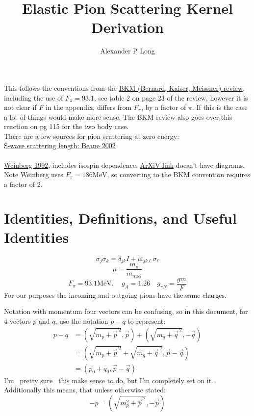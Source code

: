 \documentclass[11pt]{article}
\author{Alexander P Long}
\title{Elastic Pion Scattering Kernel Derivation}
\newcommand{\sq}{^{\,2}}
\begin{document}
\maketitle
This follows the conventions from the \href{https://arxiv.org/abs/hep-ph/9501384v1}{BKM (Bernard, Kaiser, Meissner)  review}, including the use of $F_\pi=93.1$, see table 2 on page 23 of the review, however it is not clear if $F$ in the appendix, differs from $F_\pi$, by a factor of $\pi$. If this is the case a lot of things would make more sense.
The BKM review also goes over this reaction on pg 115 for the two body case.\\

There are a few sources for pion scattering at zero energy:\\
\href{https://arxiv.org/abs/hep-ph/0206219v1}{S-wave scattering length: Beane 2002}\\~\\
\href{https://www.sciencedirect.com/science/article/abs/pii/037026939290099P}{Weinberg 1992}, includes isospin dependence. \href{https://arxiv.org/pdf/hep-ph/9209257.pdf}{ArXiV link} doesn't have diagrams.
Note Weinberg uses $F_\pi=186 \mathrm{MeV}$, so converting to the BKM convention requires a factor of 2.
\tableofcontents
\section{Identities, Definitions, and Useful Identities}
\begin{equation}
    \sigma_j \sigma_k = \delta_{jk} I + i \varepsilon_{jk\ell} \sigma_{\ell}
\end{equation}
\begin{equation}
    \mu= \frac{m_\pi}{m_{nucl}}
\end{equation}
\begin{equation}
    F_\pi=93.1 \mathrm{MeV}, \quad g_A = 1.26\quad g_{\pi N}= \frac{gm}{F} 
\end{equation}
For our purposes the incoming and outgoing pions have the same charges.

Notation with momentum four vectors can be confusing, so in this document, for $4$-vectors $p$ and $q$, use the notation
$p-q$ to represent:
\begin{align}
    p-q&= (\sqrt{m_p+\vec{p}\sq}, \vec{p}) + (\sqrt{m_q+\vec{q}\sq},-\vec{q})\\
       &= \left(\sqrt{m_p+\vec{p}\sq}+\sqrt{m_q+\vec{q}\sq},\vec{p}-\vec{q} \right)\\
       &= \left(p_0+q_0,\vec{p}-\vec{q} \right)
\end{align}
I'm ~pretty sure~ this make sense to do, but I'm completely set on it. Additionally this means, that unless otherwise
stated:
\begin{equation}
    -p= \left( \sqrt{m_p^2 + \vec{p}\sq },-\vec{p} \right)
\end{equation}
\end{document}
